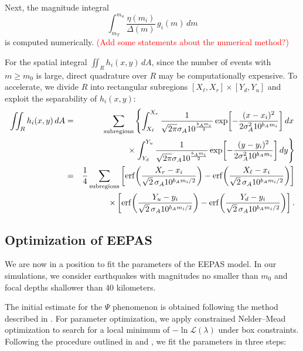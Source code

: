 \documentclass[extra,mreferee]{gji}
\theoremstyle{lemma}
\begin{document}
Next, the magnitude integral
\[
\int_{m_T}^{m_u} \frac{\eta(m_i)}{\Delta(m)}\, g_i(m)\, dm
\]
is computed numerically. \textcolor{red}{(Add some statements about the numerical method?) }

For the spatial integral $\iint_R h_i(x, y)\, dA$, since the number of events with $m \ge m_0$ is large, direct quadrature over $R$ may be computationally expensive. To accelerate, we divide $R$ into rectangular subregions $[X_\ell, X_r] \times [Y_d, Y_u]$ and exploit the separability of $h_i(x, y)$:
\begin{eqnarray}
\iint_{R} h_i(x, y)\, dA 
&=& \sum_{\text{subregions}} \left\{ \int_{X_\ell}^{X_r} \frac{1}{\sqrt{2\pi} \sigma_A 10^{\frac{b_A m_i}{2}}} 
\exp\!\left[ -\frac{(x - x_i)^2}{2 \sigma_A^2 10^{b_A m_i}} \right] dx \right. \notag \\
&& \hspace{2cm} \times \left. \int_{Y_d}^{Y_u} \frac{1}{\sqrt{2\pi} \sigma_A 10^{\frac{b_A m_i}{2}}} 
\exp\!\left[ -\frac{(y - y_i)^2}{2 \sigma_A^2 10^{b_A m_i}} \right] dy \right\} \notag \\
&=& \frac{1}{4} \sum_{\text{subregions}} \left[ \operatorname{erf}\!\left( \frac{X_r - x_i}{\sqrt{2}\, \sigma_A 10^{b_A m_i / 2}} \right) 
- \operatorname{erf}\!\left( \frac{X_\ell - x_i}{\sqrt{2}\, \sigma_A 10^{b_A m_i / 2}} \right) \right] \notag \\
&& \times \left[ \operatorname{erf}\!\left( \frac{Y_u - y_i}{\sqrt{2}\, \sigma_A 10^{b_A m_i / 2}} \right) 
- \operatorname{erf}\!\left( \frac{Y_d - y_i}{\sqrt{2}\, \sigma_A 10^{b_A m_i / 2}} \right) \right].
\label{inth1i}
\end{eqnarray}




\subsection{Optimization of EEPAS}

We are now in a position to fit the parameters of the EEPAS model. In our simulations, we consider earthquakes with magnitudes no smaller than $m_0$ and focal depths shallower than 40 kilometers.

The initial estimate for the $\Psi$ phenomenon is obtained following the method described in \cite{psi}. For parameter optimization, we apply constrained Nelder–Mead optimization to search for a local minimum of $-\ln \mathcal{L}(\lambda)$ under box constraints. Following the procedure outlined in \cite{2023ER} and \cite{RE}, we fit the parameters in three steps:
\end{document}
